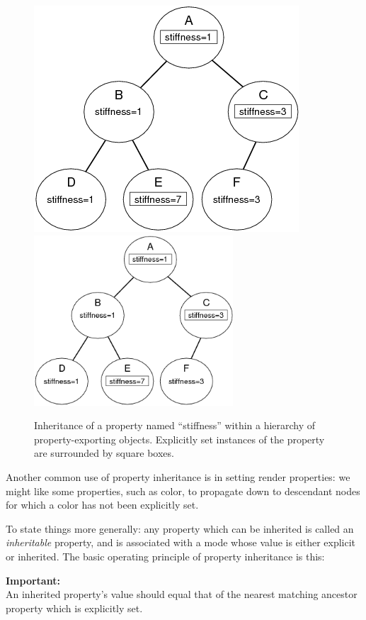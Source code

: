 \documentclass{article}
\begin{document}
\begin{figure}
\begin{center}
\iflatexml
\includegraphics[]{images/inheritance}
\else
\includegraphics[height=2.5in]{images/inheritance}
\fi
\end{center}
\caption{Inheritance of a property named ``stiffness'' within a
hierarchy of property-exporting objects. Explicitly set instances of
the property are surrounded by square boxes.}%
\label{inheritFig}
\end{figure}

Another common use of property inheritance is in setting render
properties: we might like some properties, such as color, to propagate
down to descendant nodes for which a color has not been explicitly
set.

To state things more generally: any property which can be inherited is
called an {\it inheritable} property, and is associated with a mode
whose value is either explicit or inherited. The basic operating
principle of property inheritance is this:

\begin{sideblock}
{\bf Important:}\\
An inherited property's value should equal that
of the nearest matching ancestor property which is explicitly set.
\end{sideblock}
\end{document}
